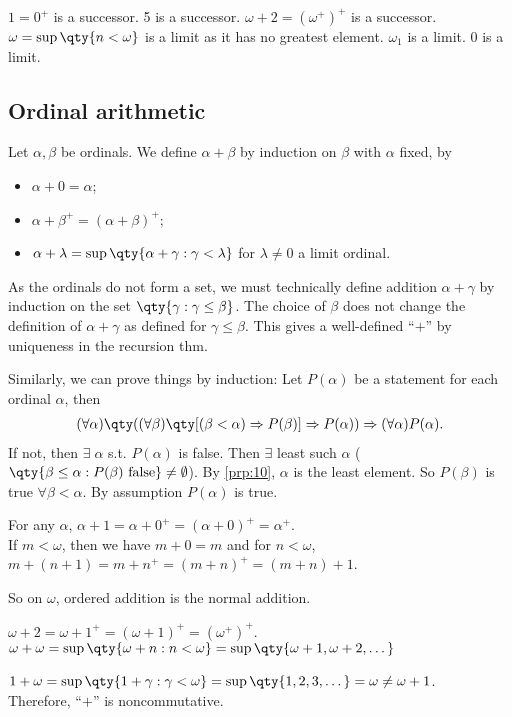 \begin{example}
    $1 = 0^+$ is a successor.
    5 is a successor.
    $\omega + 2 = (\omega^+)^+$ is a successor.
    $\omega = \sup \qty{n < \omega}$ is a limit as it has no greatest element.
    $\omega_1$ is a limit.
    0 is a limit.
\end{example}

\subsection{Ordinal arithmetic}
Let $\alpha, \beta$ be ordinals.
We define $\alpha + \beta$ by induction on $\beta$ with $\alpha$ fixed, by
\begin{itemize}
    \item $\alpha + 0 = \alpha$;
    \item $\alpha + \beta^+ = (\alpha + \beta)^+$;
    \item $\alpha + \lambda = \sup\qty{\alpha + \gamma : \gamma < \lambda}$ for $\lambda \neq 0$ a limit ordinal.
\end{itemize}

\begin{remark}
    As the ordinals do not form a set, we must technically define addition $\alpha + \gamma$ by induction on the set $\qty{\gamma : \gamma \leq \beta}$.
    The choice of $\beta$ does not change the definition of $\alpha + \gamma$ as defined for $\gamma \leq \beta$.
    This gives a well-defined ``$+$'' by uniqueness in the recursion thm.

    Similarly, we can prove things by induction:
    Let $P(\alpha)$ be a statement for each ordinal $\alpha$, then
    \begin{align*}
        (\forall \alpha) \qty((\forall \beta) \qty[(\beta < \alpha) \implies P(\beta)] \implies P(\alpha)) \implies (\forall \alpha) P(\alpha).
    \end{align*}
    If not, then $\exists \; \alpha$ s.t. $P(\alpha)$ is false.
    Then $\exists$ least such $\alpha$ ($\qty{\beta \leq \alpha : P(\beta) \text{ false}} \neq \emptyset$).
    By \cref{prp:10}, $\alpha$ is the least element.
    So $P(\beta)$ is true $\forall \beta < \alpha$.
    By assumption $P(\alpha)$ is true.
\end{remark}

\begin{example}
    For any $\alpha$, $\alpha + 1 = \alpha + 0^+ = (\alpha + 0)^+ = \alpha^+$. \\
    If $m < \omega$, then we have $m + 0 = m$ and for $n < \omega$, $m + (n + 1) = m + n^+ = (m + n)^+ = (m+n) + 1$.

    So on $\omega$, ordered addition is the normal addition.

    $\omega + 2 = \omega + 1^+ = (\omega + 1)^+ = (\omega^+)^+$. \\
    $\omega + \omega = \sup \qty{\omega + n : n < \omega} = \sup\qty{\omega + 1, \omega + 2, \dots}$

    $1 + \omega = \sup\qty{1 + \gamma : \gamma < \omega} = \sup\qty{1, 2, 3, \dots} = \omega \neq \omega + 1$. \\
    Therefore, ``$+$'' is noncommutative.
\end{example}

